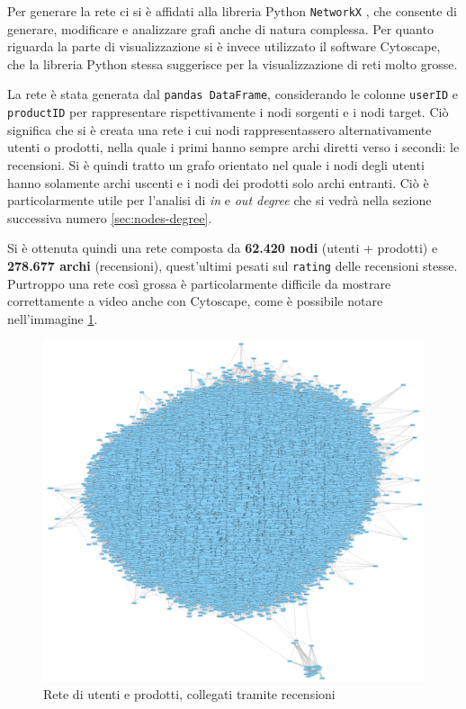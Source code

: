 \documentclass[hidelinks, 12pt]{article}
\begin{document}
Per generare la rete ci si è affidati alla libreria Python \texttt{NetworkX} \cite{site:networkx}, che consente di generare, modificare e analizzare grafi anche di natura complessa. Per quanto riguarda la parte di visualizzazione si è invece utilizzato il software Cytoscape, che la libreria Python stessa suggerisce per la visualizzazione di reti molto grosse.

La rete è stata generata dal \texttt{pandas DataFrame}, considerando le colonne \texttt{userID} e \texttt{productID} per rappresentare rispettivamente i nodi sorgenti e i nodi target. Ciò significa che si è creata una rete i cui nodi rappresentassero alternativamente utenti o prodotti, nella quale i primi hanno sempre archi diretti verso i secondi: le recensioni. Si è quindi tratto un grafo orientato nel quale i nodi degli utenti hanno solamente archi uscenti e i nodi dei prodotti solo archi entranti. Ciò è particolarmente utile per l'analisi di \textit{in} e \textit{out degree} che si vedrà nella sezione successiva numero \ref{sec:nodes-degree}.

Si è ottenuta quindi una rete composta da \textbf{62.420 nodi} (utenti + prodotti) e \textbf{278.677 archi} (recensioni), quest'ultimi pesati sul \texttt{rating} delle recensioni stesse. Purtroppo una rete così grossa è particolarmente difficile da mostrare correttamente a video anche con Cytoscape, come è possibile notare nell'immagine \ref{fig:cyto-net-full}.

\begin{figure}[H]
	\centering
	\includegraphics[scale=0.9]{images/03_01_cyto_net_1.png}
	\caption[Rete di utenti e prodotti, collegati tramite recensioni]{Rete di utenti e prodotti, collegati tramite recensioni}
	\label{fig:cyto-net-full}
\end{figure}
\end{document}
